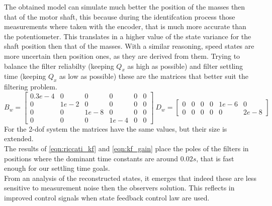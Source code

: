 The obtained model can simulate much better the position of the masses then that of the motor shaft, this because during the identifcation process those measurements where taken with the encoder, that is much more accurate than the potentiometer. This translates in a higher value of the state variance for the shaft position then that of the masses. With a similar reasoning, speed states are more uncertain then position ones, as they are derived from them. Trying to balance the filter reliabilty (keeping $Q_x$ as high as possible) and filter settling time (keeping $Q_x$ as low as possible) these are the matrices that better suit the filtering problem.
\begin{equation}
	B_w = \begin{bmatrix}
		0.3e-4 & 0 & 0 & 0 & 0 & 0\\
		0 & 1e-2 & 0 & 0 & 0 & 0 \\
		0 & 0 & 1e-8 & 0 & 0 & 0  \\
		0 & 0 & 0 & 1e-4 & 0 & 0
	\end{bmatrix} \
	D_w = \begin{bmatrix}
		0 & 0 & 0 & 0 & 1e-6 & 0\\
		0 & 0 & 0 & 0 & 0 & 2e-8 
	\end{bmatrix} 
	\label{eqn:b_w_d_w}
\end{equation}
For the \acrshort{2-dof} system the matrices have the same values, but their size is extended.\\
The results of \cref{eqn:riccati_kf} and \cref{eqn:kf_gain} place the poles of the filters in positions where the dominant time constants are around $0.02 s$, that is fast enough for our settling time goals. \\

From an analysis of the reconstructed states, it emerges that indeed these are less sensitive to measurement noise then the observers solution. This reflects in improved control signals when state feedback control law are used. \\

